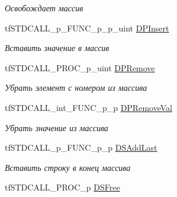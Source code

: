 \begin{DoxyCompactItemize}
\begin{DoxyCompactList}\small\item\em Освобождает массив \end{DoxyCompactList}\item 
\hypertarget{structs_functions_array_c_p_u_a74c96e1cded0d406798b2183e907c949}{tf\-S\-T\-D\-C\-A\-L\-L\-\_\-p\-\_\-\-F\-U\-N\-C\-\_\-p\-\_\-p\-\_\-uint \hyperlink{structs_functions_array_c_p_u_a74c96e1cded0d406798b2183e907c949}{D\-P\-Insert}}\label{structs_functions_array_c_p_u_a74c96e1cded0d406798b2183e907c949}

\begin{DoxyCompactList}\small\item\em Вставить значение в массив \end{DoxyCompactList}\item 
\hypertarget{structs_functions_array_c_p_u_addf3e8effd0f504935605043705058c2}{tf\-S\-T\-D\-C\-A\-L\-L\-\_\-\-P\-R\-O\-C\-\_\-p\-\_\-uint \hyperlink{structs_functions_array_c_p_u_addf3e8effd0f504935605043705058c2}{D\-P\-Remove}}\label{structs_functions_array_c_p_u_addf3e8effd0f504935605043705058c2}

\begin{DoxyCompactList}\small\item\em Убрать элемент с номером из массива \end{DoxyCompactList}\item 
\hypertarget{structs_functions_array_c_p_u_a2e196290ab0c9bf32cb66fe65fdad5d8}{tf\-S\-T\-D\-C\-A\-L\-L\-\_\-int\-\_\-\-F\-U\-N\-C\-\_\-p\-\_\-p \hyperlink{structs_functions_array_c_p_u_a2e196290ab0c9bf32cb66fe65fdad5d8}{D\-P\-Remove\-Val}}\label{structs_functions_array_c_p_u_a2e196290ab0c9bf32cb66fe65fdad5d8}

\begin{DoxyCompactList}\small\item\em Убрать значение из массива \end{DoxyCompactList}\item 
\hypertarget{structs_functions_array_c_p_u_ac025f7f80e66605416221e05f3af2fe8}{tf\-S\-T\-D\-C\-A\-L\-L\-\_\-p\-\_\-\-F\-U\-N\-C\-\_\-p\-\_\-p \hyperlink{structs_functions_array_c_p_u_ac025f7f80e66605416221e05f3af2fe8}{D\-S\-Add\-Last}}\label{structs_functions_array_c_p_u_ac025f7f80e66605416221e05f3af2fe8}

\begin{DoxyCompactList}\small\item\em Вставить строку в конец массива \end{DoxyCompactList}\item 
\hypertarget{structs_functions_array_c_p_u_a6e67efdea05e176ab0d814b994778989}{tf\-S\-T\-D\-C\-A\-L\-L\-\_\-\-P\-R\-O\-C\-\_\-p \hyperlink{structs_functions_array_c_p_u_a6e67efdea05e176ab0d814b994778989}{D\-S\-Free}}\label{structs_functions_array_c_p_u_a6e67efdea05e176ab0d814b994778989}


\end{DoxyCompactItemize}
